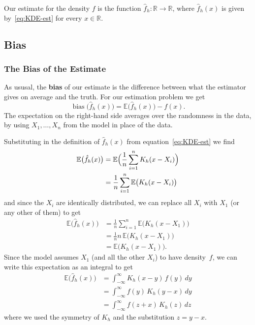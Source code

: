 \documentclass[
  a4paper,
]{article}
\theoremstyle{definition}
\theoremstyle{definition}
\theoremstyle{definition}
\theoremstyle{definition}
\theoremstyle{remark}
\begin{document}
Our estimate for the density \(f\) is the function \(\hat f_h\colon \mathbb{R}\to \mathbb{R}\),
where \(\hat f_h(x)\) is given by~\eqref{eq:KDE-est} for every \(x \in\mathbb{R}\).

\subsection{Bias}\label{X02-error-bias}

\subsubsection{The Bias of the Estimate}\label{the-bias-of-the-estimate}

As ususal, the \textbf{bias} of our estimate is the difference between
what the estimator gives on average and the truth. For our estimation
problem we get
\begin{equation*}
    \mathop{\mathrm{bias}}\bigl(\hat f_h(x)\bigr)
    = \mathbb{E}\bigl(\hat f_h(x)\bigr) - f(x).
\end{equation*}
The expectation on the right-hand side averages over the randomness
in the data, by using \(X_1, \ldots, X_n\) from the model in place of
the data.

Substituting in the definition of \(\hat f_h(x)\) from equation~\eqref{eq:KDE-est}
we find
\begin{align*}
    \mathbb{E}\bigl(\hat f_h(x)\bigr)
    &= \mathbb{E}\Bigl( \frac{1}{n} \sum_{i=1}^n K_h(x - X_i) \Bigr) \\
    &= \frac{1}{n} \sum_{i=1}^n \mathbb{E}\bigl( K_h(x - X_i) \bigr)
\end{align*}
and since the \(X_i\) are identically distributed, we can replace
all \(X_i\) with \(X_1\) (or any other of them) to get
\begin{align*}
    \mathbb{E}\bigl(\hat f_h(x)\bigr)
    &= \frac{1}{n} \sum_{i=1}^n \mathbb{E}\bigl( K_h(x - X_1) \bigr) \\
    &= \frac{1}{n} n \, \mathbb{E}\bigl( K_h(x - X_1) \bigr) \\
    &= \mathbb{E}\bigl( K_h(x - X_1) \bigr).
\end{align*}
Since the model assumes \(X_1\) (and all the other \(X_i\)) to have density~\(f\),
we can write this expectation as an integral to get
\begin{align*}
    \mathbb{E}\bigl(\hat f_h(x)\bigr)
    &= \int_{-\infty}^\infty K_h(x - y) \, f(y) \, dy \\
    &= \int_{-\infty}^\infty f(y) \, K_h(y - x) \, dy \\
    &= \int_{-\infty}^\infty f(z+x) \, K_h(z) \, dz
\end{align*}
where we used the symmetry of \(K_h\) and the substitution \(z = y - x\).
\end{document}
